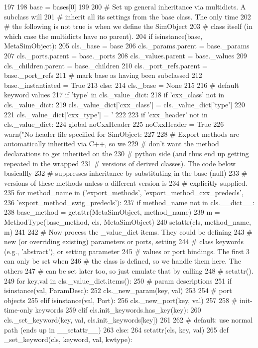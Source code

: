 \begin{DoxyCode}
197 
198         base = bases[0]
199 
200         # Set up general inheritance via multidicts.  A subclass will
201         # inherit all its settings from the base class.  The only time
202         # the following is not true is when we define the SimObject
203         # class itself (in which case the multidicts have no parent).
204         if isinstance(base, MetaSimObject):
205             cls._base = base
206             cls._params.parent = base._params
207             cls._ports.parent = base._ports
208             cls._values.parent = base._values
209             cls._children.parent = base._children
210             cls._port_refs.parent = base._port_refs
211             # mark base as having been subclassed
212             base._instantiated = True
213         else:
214             cls._base = None
215 
216         # default keyword values
217         if 'type' in cls._value_dict:
218             if 'cxx_class' not in cls._value_dict:
219                 cls._value_dict['cxx_class'] = cls._value_dict['type']
220 
221             cls._value_dict['cxx_type'] = '%
222 
223             if 'cxx_header' not in cls._value_dict:
224                 global noCxxHeader
225                 noCxxHeader = True
226                 warn("No header file specified for SimObject: %
227 
228         # Export methods are automatically inherited via C++, so we
229         # don't want the method declarations to get inherited on the
230         # python side (and thus end up getting repeated in the wrapped
231         # versions of derived classes).  The code below basicallly
232         # suppresses inheritance by substituting in the base (null)
233         # versions of these methods unless a different version is
234         # explicitly supplied.
235         for method_name in ('export_methods', 'export_method_cxx_predecls',
236                             'export_method_swig_predecls'):
237             if method_name not in cls.__dict__:
238                 base_method = getattr(MetaSimObject, method_name)
239                 m = MethodType(base_method, cls, MetaSimObject)
240                 setattr(cls, method_name, m)
241 
242         # Now process the _value_dict items.  They could be defining
243         # new (or overriding existing) parameters or ports, setting
244         # class keywords (e.g., 'abstract'), or setting parameter
245         # values or port bindings.  The first 3 can only be set when
246         # the class is defined, so we handle them here.  The others
247         # can be set later too, so just emulate that by calling
248         # setattr().
249         for key,val in cls._value_dict.items():
250             # param descriptions
251             if isinstance(val, ParamDesc):
252                 cls._new_param(key, val)
253 
254             # port objects
255             elif isinstance(val, Port):
256                 cls._new_port(key, val)
257 
258             # init-time-only keywords
259             elif cls.init_keywords.has_key(key):
260                 cls._set_keyword(key, val, cls.init_keywords[key])
261 
262             # default: use normal path (ends up in __setattr__)
263             else:
264                 setattr(cls, key, val)
265 
    def _set_keyword(cls, keyword, val, kwtype):
\end{DoxyCode}
